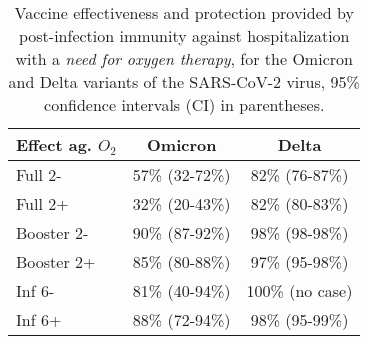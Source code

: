 \documentclass[a4paper,12pt]{article}
\begin{document}
\thispagestyle{empty}
\setcounter{table}{3}
%
\begin{table}[!ht]
\caption{Vaccine effectiveness and protection provided by post-infection immunity against hospitalization with a {\it need for oxygen therapy}, for the Omicron and Delta variants of the SARS-CoV-2 virus, 95\% confidence intervals (CI) in parentheses.}
\vspace{2mm}
\label{tabOalone}
\centering
\begin{tabular}{|l|c|c|}
\hline
\cellcolor{gray!20}Effect ag. $O_2$&\cellcolor{gray!20}Omicron&\cellcolor{gray!20}Delta\\
\hline
Full 2-& 57\% (32-72\%) & 82\% (76-87\%)\\
\cellcolor{gray!10}Full 2+& \cellcolor{gray!10}32\% (20-43\%)&\cellcolor{gray!10}82\% (80-83\%)\\
Booster 2-&90\% (87-92\%)&98\% (98-98\%)\\
\cellcolor{gray!10}Booster 2+&\cellcolor{gray!10}85\% (80-88\%)&\cellcolor{gray!10}97\% (95-98\%)\\
Inf 6-& 81\% (40-94\%)&100\% (no case)\\
\cellcolor{gray!10}Inf 6+&\cellcolor{gray!10}88\% (72-94\%)&\cellcolor{gray!10}98\% (95-99\%)\\
\hline
\end{tabular}
\end{table}
\end{document}
